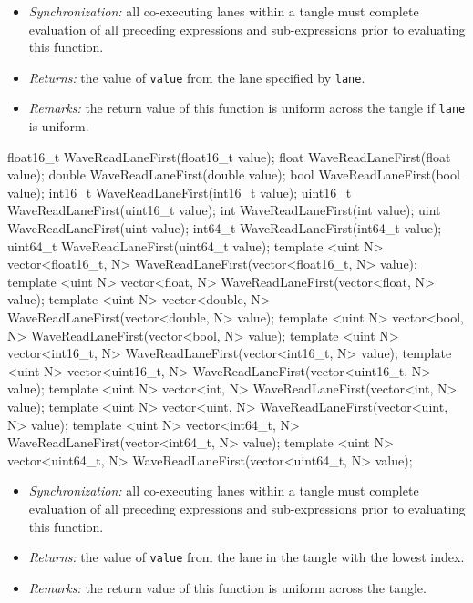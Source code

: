 \begin{itemize}
  \item \textit{Synchronization:} all co-executing \gls{lane}s within a \gls{tangle}
  must complete evaluation of all preceding expressions and sub-expressions
  prior to evaluating this function.
  \item \textit{Returns:} the value of \texttt{value} from the \gls{lane}
  specified by \texttt{lane}.
  \item \textit{Remarks:} the return value of this function is uniform across
  the \gls{tangle} if \texttt{lane} is uniform.
\end{itemize}

\begin{HLSL}
float16_t WaveReadLaneFirst(float16_t value);
float WaveReadLaneFirst(float value);
double WaveReadLaneFirst(double value);
bool WaveReadLaneFirst(bool value);
int16_t WaveReadLaneFirst(int16_t value);
uint16_t WaveReadLaneFirst(uint16_t value);
int WaveReadLaneFirst(int value);
uint WaveReadLaneFirst(uint value);
int64_t WaveReadLaneFirst(int64_t value);
uint64_t WaveReadLaneFirst(uint64_t value);
template <uint N> vector<float16_t, N> WaveReadLaneFirst(vector<float16_t, N> value);
template <uint N> vector<float, N> WaveReadLaneFirst(vector<float, N> value);
template <uint N> vector<double, N> WaveReadLaneFirst(vector<double, N> value);
template <uint N> vector<bool, N> WaveReadLaneFirst(vector<bool, N> value);
template <uint N> vector<int16_t, N> WaveReadLaneFirst(vector<int16_t, N> value);
template <uint N> vector<uint16_t, N> WaveReadLaneFirst(vector<uint16_t, N> value);
template <uint N> vector<int, N> WaveReadLaneFirst(vector<int, N> value);
template <uint N> vector<uint, N> WaveReadLaneFirst(vector<uint, N> value);
template <uint N> vector<int64_t, N> WaveReadLaneFirst(vector<int64_t, N> value);
template <uint N> vector<uint64_t, N> WaveReadLaneFirst(vector<uint64_t, N> value);
\end{HLSL}

\begin{itemize}
  \item \textit{Synchronization:} all co-executing \gls{lane}s within a \gls{tangle}
  must complete evaluation of all preceding expressions and sub-expressions
  prior to evaluating this function.
  \item \textit{Returns:} the value of \texttt{value} from the lane in the
  \gls{tangle} with the lowest index.
  \item \textit{Remarks:} the return value of this function is uniform across
  the \gls{tangle}.
\end{itemize}

